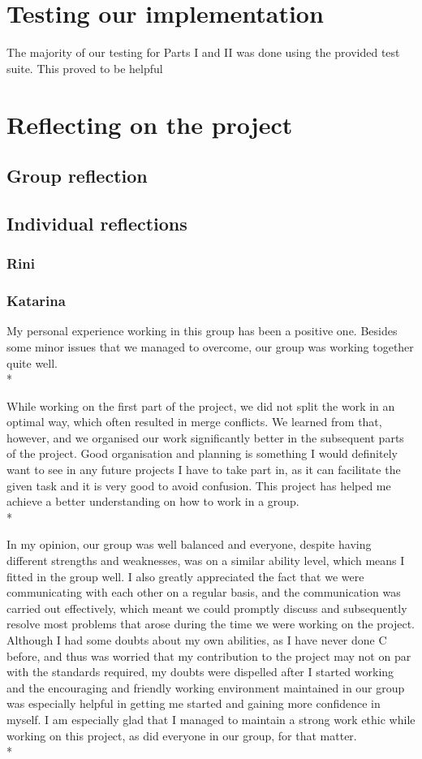 \documentclass[letterpaper,11pt]{article}
\begin{document}
    \section{Testing our implementation}
    The majority of our testing for Parts I and II was done using the provided test suite. This proved to be helpful

    \section{Reflecting on the project}
    \subsection{Group reflection}
    \subsection{Individual reflections}
    \subsubsection{Rini}
    \subsubsection{Katarina}
    My personal experience working in this group has been a positive one. Besides some minor issues that we managed to overcome, our group was working together quite well.\\*

    \noindent While working on the first part of the project, we did not split the work in an optimal way, which often resulted in merge conflicts. We learned from that, however, and we organised our work significantly better in the subsequent parts of the project. Good organisation and planning is something I would definitely want to see in any future projects I have to take part in, as it can facilitate the given task and it is very good to avoid confusion. This project has helped me achieve a better understanding on how to work in a group.\\*

    \noindent In my opinion, our group was well balanced and everyone, despite having different strengths and weaknesses, was on a similar ability level, which means I fitted in the group well. I also greatly appreciated the fact that we were communicating with each other on a regular basis, and the communication was carried out effectively, which meant we could promptly discuss and subsequently resolve most problems that arose during the time we were working on the project. Although I had some doubts about my own abilities, as I have never done C before,  and thus was worried that my contribution to the project may not on par with the standards required, my doubts were dispelled after I started working and the encouraging and friendly working environment maintained in our group was especially helpful in getting me started and gaining more confidence in myself. I am especially glad that I managed to maintain a strong work ethic while working on this project, as did everyone in our group, for that matter.\\*
\end{document}
